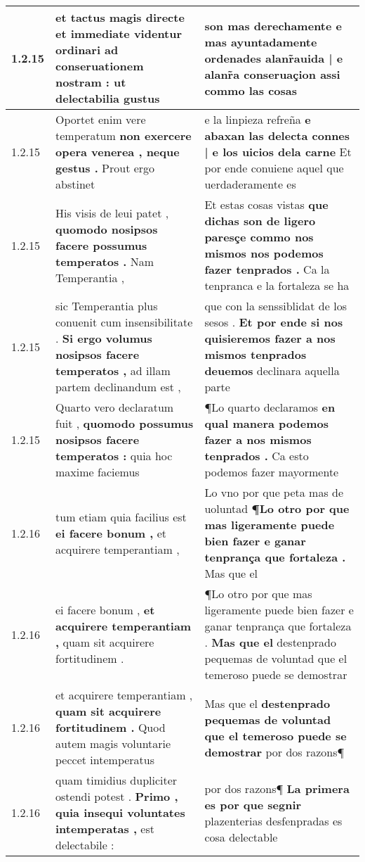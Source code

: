 \begin{tabular}{|p{1cm}|p{6.5cm}|p{6.5cm}|}
1.2.15 & et tactus magis directe \textbf{ et immediate videntur ordinari ad conseruationem nostram : } ut delectabilia gustus & son mas derechamente \textbf{ e mas ayuntadamente ordenades alanr̃auida | e alanr̃a conseruaçion } assi commo las cosas \\\hline
1.2.15 & Oportet enim vere temperatum \textbf{ non exercere opera venerea , neque gestus . } Prout ergo abstinet & e la linpieza refreña \textbf{ e abaxan las delecta connes | e los uicios dela carne } Et por ende conuiene aquel que uerdaderamente es \\\hline
1.2.15 & His visis de leui patet , \textbf{ quomodo nosipsos facere possumus temperatos . } Nam Temperantia , & Et estas cosas vistas \textbf{ que dichas son de ligero paresçe commo nos mismos nos podemos fazer tenprados . } Ca la tenpranca e la fortaleza se ha \\\hline
1.2.15 & sic Temperantia plus conuenit cum insensibilitate . \textbf{ Si ergo volumus nosipsos facere temperatos , } ad illam partem declinandum est , & que con la senssiblidat de los sesos . \textbf{ Et por ende si nos quisieremos fazer a nos mismos tenprados deuemos } declinara aquella parte \\\hline
1.2.15 & Quarto vero declaratum fuit , \textbf{ quomodo possumus nosipsos facere temperatos : } quia hoc maxime faciemus & ¶Lo quarto declaramos \textbf{ en qual manera podemos fazer a nos mismos tenprados . } Ca esto podemos fazer mayormente \\\hline
1.2.16 & tum etiam quia facilius est \textbf{ ei facere bonum , } et acquirere temperantiam , & Lo vno por que peta mas de uoluntad \textbf{ ¶Lo otro por que mas ligeramente puede bien fazer e ganar tenprança que fortaleza . } Mas que el \\\hline
1.2.16 & ei facere bonum , \textbf{ et acquirere temperantiam , } quam sit acquirere fortitudinem . & ¶Lo otro por que mas ligeramente puede bien fazer e ganar tenprança que fortaleza . \textbf{ Mas que el } destenprado pequemas de voluntad que el temeroso puede se demostrar \\\hline
1.2.16 & et acquirere temperantiam , \textbf{ quam sit acquirere fortitudinem . } Quod autem magis voluntarie peccet intemperatus & Mas que el \textbf{ destenprado pequemas de voluntad que el temeroso puede se demostrar } por dos razons¶ \\\hline
1.2.16 & quam timidius dupliciter ostendi potest . \textbf{ Primo , quia insequi voluntates intemperatas , } est delectabile : & por dos razons¶ \textbf{ La primera es por que segnir } plazenterias desfenpradas es cosa delectable \\\hline

\end{tabular}
